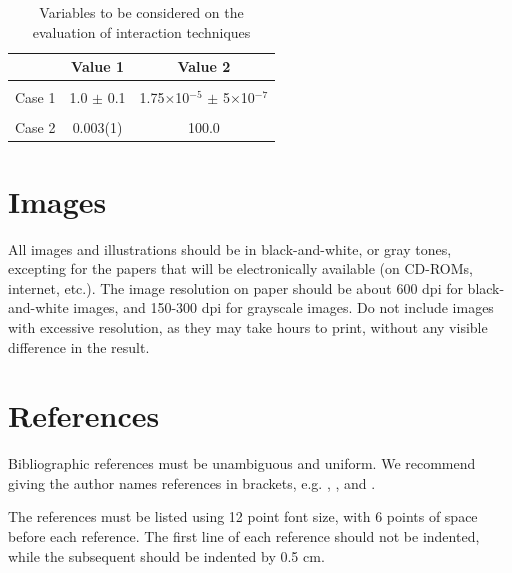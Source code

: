 \documentclass[12pt]{article}
\begin{document}
\begin{table}[ht]
\centering
\caption{Variables to be considered on the evaluation of interaction
  techniques}
\label{tab:exTable1}
\smallskip
\begin{tabular}{|l|c|c|}
\hline
& Value 1 & Value 2\\[0.5ex]
\hline
&&\\[-2ex]
Case 1 & 1.0 $\pm$ 0.1 & 1.75$\times$10$^{-5}$ $\pm$ 5$\times$10$^{-7}$\\[0.5ex]
\hline
&&\\[-2ex]
Case 2 & 0.003(1) & 100.0\\[0.5ex]
\hline
\end{tabular}
\end{table}

\section{Images}

All images and illustrations should be in black-and-white, or gray tones,
excepting for the papers that will be electronically available (on CD-ROMs,
internet, etc.). The image resolution on paper should be about 600 dpi for
black-and-white images, and 150-300 dpi for grayscale images.  Do not include
images with excessive resolution, as they may take hours to print, without any
visible difference in the result. 

\section{References}

Bibliographic references must be unambiguous and uniform.  We recommend giving
the author names references in brackets, e.g. \cite{knuth:84},
\cite{boulic:91}, and \cite{smith:99}.

The references must be listed using 12 point font size, with 6 points of space
before each reference. The first line of each reference should not be
indented, while the subsequent should be indented by 0.5 cm.



\end{document}

